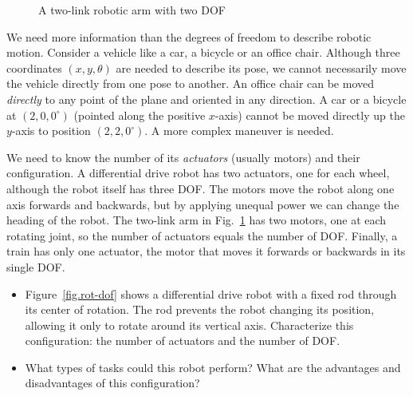 \begin{figure}
\begin{center}
\end{center}
\caption{A two-link robotic arm with two DOF}\label{fig.two-link}
\end{figure}

We need more information than the degrees of freedom to describe robotic motion. Consider a vehicle like a car, a bicycle or an office chair. Although three coordinates $(x,y,\theta)$ are needed to describe its pose, we cannot necessarily move the vehicle directly from one pose to another. An office chair can be moved \emph{directly} to any point of the plane and oriented in any direction. A car or a bicycle at $(2,0,0^\circ)$ (pointed along the positive $x$-axis) cannot be moved directly up the $y$-axis to position $(2,2,0^\circ)$. A more complex maneuver is needed.

We need to know the number of its \emph{actuators} (usually motors) and their configuration. A differential drive robot has two actuators, one for each wheel, although the robot itself has three DOF. The motors move the robot along one axis forwards and backwards, but by applying unequal power we can change the heading  of the robot. The two-link arm in Fig.~\ref{fig.two-link} has two motors, one at each rotating joint, so the number of actuators equals the number of DOF. Finally, a train has only one actuator, the motor that moves it forwards or backwards in its single DOF.

\begin{framed}
\begin{itemize}
\item Figure~\ref{fig.rot-dof} shows a differential drive robot with a fixed rod through its center of rotation. The rod prevents the robot changing its position, allowing it only to rotate around its vertical axis. Characterize this configuration: the number of actuators and the number of DOF.
\item What types of tasks could this robot perform? What are the advantages and disadvantages of this configuration?
\end{itemize}
\end{framed}


